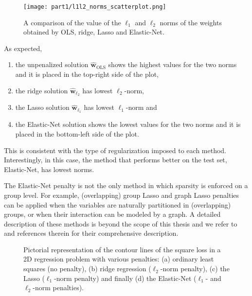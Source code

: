 			\begin{figure}[]
				\centering
				\texttt{[image: part1/l1l2\_norms\_scatterplot.png]}
				\caption{A comparison of the value of the $\ell_1$ and $\ell_2$ norms of the weights obtained by OLS, ridge, Lasso and Elastic-Net.} \label{fig:l1l2_norms_scatterplot}
		  \end{figure}
	  
			As expected,
			\begin{enumerate}
				\item the unpenalized solution $\bm{\hat w}_{\text{OLS}}$ shows the highest values for the two norms and it is placed in the top-right side of the plot,
				\item the ridge solution $\bm{\hat w}_{\ell_2}$ has lowest $\ell_2$-norm,
				\item the Lasso solution $\bm{\hat w}_{\ell_1}$ has lowest $\ell_1$-norm and
				\item the Elastic-Net solution shows the lowest values for the two norms and it is placed in the bottom-left side of the plot.
		  \end{enumerate}
			This is consistent with the type of regularization imposed to each method. Interestingly, in this case, the method that performs better on the test set, Elastic-Net, has lowest norms.

			The Elastic-Net penalty is not the only method in which sparsity is enforced on a group level. For example, (overlapping) group Lasso and graph Lasso penalties can be applied when the variables are naturally partitioned in (overlapping) groups, or when their interaction can be modeled by a graph. A detailed description of these methods is beyond the scope of this thesis and we refer to~\cite{jacob2009group, witten2009covariance} and references therein for their comprehensive description.

			\begin{figure}[]
				\centering
				\hfill%
				\caption{Pictorial representation of the contour lines of the square loss in a 2D regression problem with various penalties: (a) ordinary least squares (no penalty), (b) ridge regression ($\ell_2$-norm penalty), (c) the Lasso ($\ell_1$-norm penalty) and finally (d) the Elastic-Net ($\ell_1$- and $\ell_2$-norm penalties).} \label{fig:square_loss_penalties}
			\end{figure}


